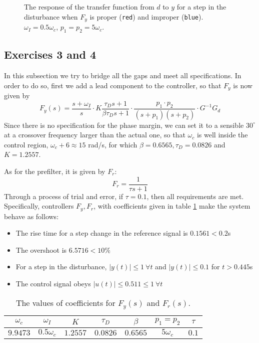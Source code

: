 \begin{figure}[H]\centering
  \scalebox{0.8}{}
  \caption{The response of the transfer function from $d$ to $y$ for a step in
    the disturbance when $F_y$ is proper (\texttt{red}) and improper
    (\texttt{blue}). $\omega_I = 0.5 \omega_c$, $p_1 = p_2 = 5\omega_c$.}
  \label{fig:step_response_2.2}
\end{figure}


\subsection{Exercises 3 and 4}

In this subsection we try to bridge all the gaps and meet all specifications.
In order to do so, first we add a lead component to the controller, so that
$F_y$ is now given by
$$F_y(s) = \dfrac{s+\omega_I}{s} \cdot K \dfrac{\tau_D s + 1}{\beta \tau_D s + 1}
\cdot \dfrac{p_1 \cdot p_2}{(s+p_1)(s+p_2)} \cdot G^{-1}G_d$$
Since there is no specification for the phase margin, we can set it to a
sensible $30^{\circ}$ at a crossover frequency larger than the actual one, so
that $\omega_c$ is well inside the control region, $\omega_c + 6 \approx 15$
rad/s, for which $\beta = 0.6565, \tau_D = 0.0826$ and $K = 1.2557$.

As for the prefilter, it is given by $F_r$:
$$F_r = \dfrac{1}{\tau s + 1}$$
Through a process of trial and error, if $\tau = 0.1$, then all requirements
are met. Specifically, controllers $F_y, F_r$, with coefficients given in
table \ref{tbl:ex34} make the system behave as follows:

\begin{itemize}
  \item The rise time for a step change in the reference signal is
    $0.1561 < 0.2$s
  \item The overshoot is $6.5716 < 10\%$
  \item For a step in the disturbance, $|y(t)| \leq 1\ \forall t$ and
  $|y(t)| \leq 0.1$ for $t > 0.445$s
  \item The control signal obeys $|u(t)| \leq 0.511 \leq 1\ \forall t$
\end{itemize}

\begin{table}\centering
    \begin{tabular}{|c|c|c|c|c|c|c|}
    \hline
    $\omega_c$ & $\omega_I$    & $K$       & $\tau_D$ & $\beta$   & $p_1 = p_2$ & $\tau$ \\ \hline
    $9.9473$   & $0.5\omega_c$ & $1.2557$  & $0.0826$ & $0.6565$  & $5\omega_c$ & $0.1$  \\ \hline
    \end{tabular}
    \caption{The values of coefficients for $F_y(s)$ and $F_r(s)$.}
    \label{tbl:ex34}
\end{table}

